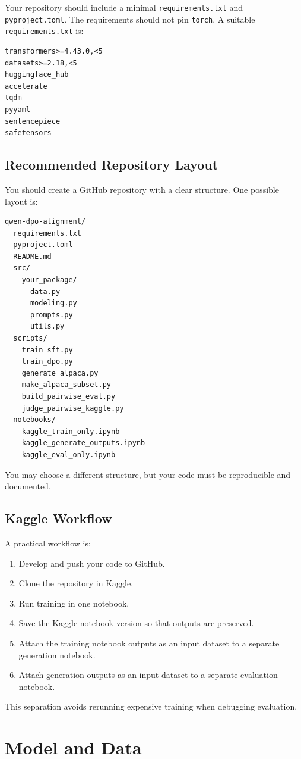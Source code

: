 \documentclass[11pt]{article}
\begin{document}
Your repository should include a minimal \texttt{requirements.txt} and \texttt{pyproject.toml}. The requirements should not pin \texttt{torch}. A suitable \texttt{requirements.txt} is:
\begin{lstlisting}
transformers>=4.43.0,<5
datasets>=2.18,<5
huggingface_hub
accelerate
tqdm
pyyaml
sentencepiece
safetensors
\end{lstlisting}

\subsection{Recommended Repository Layout}
You should create a GitHub repository with a clear structure. One possible layout is:
\begin{lstlisting}
qwen-dpo-alignment/
  requirements.txt
  pyproject.toml
  README.md
  src/
    your_package/
      data.py
      modeling.py
      prompts.py
      utils.py
  scripts/
    train_sft.py
    train_dpo.py
    generate_alpaca.py
    make_alpaca_subset.py
    build_pairwise_eval.py
    judge_pairwise_kaggle.py
  notebooks/
    kaggle_train_only.ipynb
    kaggle_generate_outputs.ipynb
    kaggle_eval_only.ipynb
\end{lstlisting}
You may choose a different structure, but your code must be reproducible and documented.

\subsection{Kaggle Workflow}
A practical workflow is:
\begin{enumerate}[leftmargin=*]
  \item Develop and push your code to GitHub.
  \item Clone the repository in Kaggle.
  \item Run training in one notebook.
  \item Save the Kaggle notebook version so that outputs are preserved.
  \item Attach the training notebook outputs as an input dataset to a separate generation notebook.
  \item Attach generation outputs as an input dataset to a separate evaluation notebook.
\end{enumerate}
This separation avoids rerunning expensive training when debugging evaluation.

\section{Model and Data}
\end{document}
